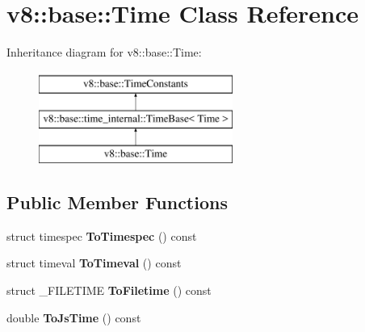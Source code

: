 \hypertarget{classv8_1_1base_1_1Time}{}\section{v8\+:\+:base\+:\+:Time Class Reference}
\label{classv8_1_1base_1_1Time}
Inheritance diagram for v8\+:\+:base\+:\+:Time\+:\begin{figure}[H]
\begin{center}
\leavevmode
\includegraphics[height=3.000000cm]{classv8_1_1base_1_1Time}
\end{center}
\end{figure}
\subsection*{Public Member Functions}
\begin{DoxyCompactItemize}
\item 
\mbox{\label{classv8_1_1base_1_1Time_af0d650400fe790876e4106b2cf700efa}} 
struct timespec {\bfseries To\+Timespec} () const
\item 
\mbox{\label{classv8_1_1base_1_1Time_a415c6ebe799a2d7e562311fac016f542}} 
struct timeval {\bfseries To\+Timeval} () const
\item 
\mbox{\label{classv8_1_1base_1_1Time_a8d6cd2d97ba2ad812891b20014e8a9d1}} 
struct \+\_\+\+F\+I\+L\+E\+T\+I\+ME {\bfseries To\+Filetime} () const
\item 
\mbox{\label{classv8_1_1base_1_1Time_a6a9b1ac92e3bc1accf60db895398c9b5}} 
double {\bfseries To\+Js\+Time} () const
\end{DoxyCompactItemize}
